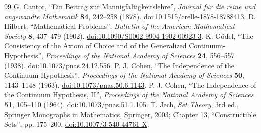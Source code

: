 \begin{thebibliography}{99}
 G. Cantor, ``Ein Beitrag zur Mannigfaltigkeitslehre'',
\emph{Journal für die reine und angewandte Mathematik} \textbf{84},
242--258 (1878). \href{https://doi.org/10.1515/crelle-1878-18788413}{doi:10.1515/crelle-1878-18788413}.
 D. Hilbert, ``Mathematical Problems'',
\emph{Bulletin of the American Mathematical Society} \textbf{8},
437--479 (1902). \href{https://doi.org/10.1090/S0002-9904-1902-00923-3}{doi:10.1090/S0002-9904-1902-00923-3}.
 K. Gödel, ``The Consistency of the Axiom of Choice and
of the Generalized Continuum-Hypothesis'', \emph{Proceedings of the National
Academy of Sciences} \textbf{24}, 556--557 (1938).
\href{https://doi.org/10.1073/pnas.24.12.556}{doi:10.1073/pnas.24.12.556}.
 P. J. Cohen, ``The Independence of the Continuum
Hypothesis'', \emph{Proceedings of the National Academy of Sciences}
\textbf{50}, 1143--1148 (1963).
\href{https://doi.org/10.1073/pnas.50.6.1143}{doi:10.1073/pnas.50.6.1143}.
 P. J. Cohen, ``The Independence of the Continuum
Hypothesis, II'', \emph{Proceedings of the National Academy of Sciences}
\textbf{51}, 105--110 (1964).
\href{https://doi.org/10.1073/pnas.51.1.105}{doi:10.1073/pnas.51.1.105}.
\enlargethispage{3\baselineskip}
 T. Jech, \emph{Set Theory}, 3rd ed.,
Springer Monographs in Mathematics, Springer, 2003; Chapter 13,
``Constructible Sets'', pp. 175--200.
\href{https://doi.org/10.1007/3-540-44761-X}{doi:10.1007/3-540-44761-X}.
\end{thebibliography}
